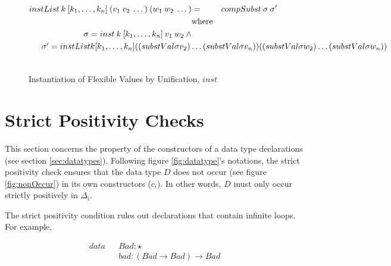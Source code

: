 \documentclass[acmsmall]{acmart}
\begin{document}
\begin{figure}[H]
\begin{equation*}
\begin{aligned}
      instList \: k \: [k_1,\dots,k_n] \: (v_1 \: v_2 \: \dots) \: (w_1 \: w_2 \: \dots) & =              & compSubst \: \sigma \: \sigma'                                                                                                                                    \\
                                                                                         & \textrm{where} &                                                                                                                                                                   \\
      \sigma = inst \: k \: [k_1,\dots,k_n] \: v_1 \: w_2 \: \land                       &                &                                                                                                                                                                   \\
      \noalign{$\sigma'                                                                             =               instList \: k [k_1,\dots,k_n] \: ((substVal \sigma \: v_2) \dots (substVal \sigma \: v_n)) \: ((substVal \sigma \: w_2) \dots (substVal \sigma \: w_n))$} \\
    \end{aligned}
  \end{equation*}
  \caption{Instantiation of Flexible Values by Unification, $inst$}
\end{figure}

\section{Strict Positivity Checks}
\label{sec:spos}

This section concerns the property of the constructors of a data type declarations (see section \ref{sec:datatypes}). Following figure \ref{fig:datatype}'s notations, the strict positivity check ensures that the data type $D$ does not occur (see figure \ref{fig:nonOccur}) in its own constructors ($c_i$). In other words, $D$ must only occur strictly positively in $\Delta_i$.

The strict positivity condition rules out declarations that contain infinite loops. For example,

\begin{equation*}
  \begin{aligned}
    data &  & Bad : \star                 \\
         &  & bad : (Bad \to Bad) \to Bad \\
  \end{aligned}
\end{equation*}
\end{document}
